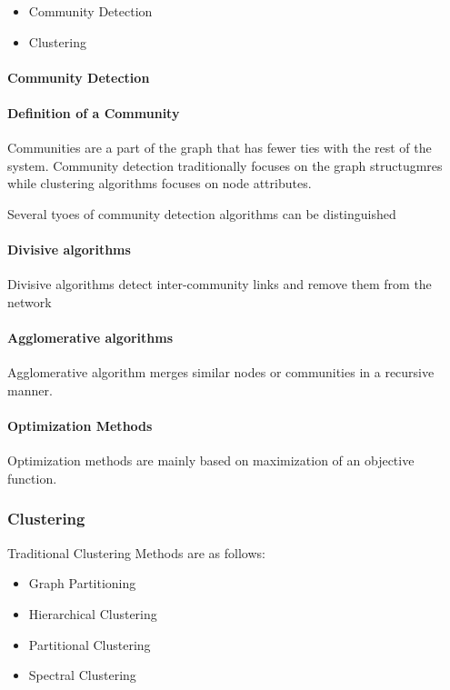 \begin{itemize}
\item Community Detection
\item Clustering
\end{itemize}

\paragraph{Community Detection}
\paragraph{Definition of a Community}
Communities are a part of the graph that has fewer ties with the rest of the system. Community detection traditionally focuses on the graph structugmres while clustering algorithms focuses on node attributes. 

Several tyoes of community detection algorithms can be distinguished
\paragraph{Divisive algorithms}
Divisive algorithms detect inter-community links and remove them from the network

\paragraph{Agglomerative algorithms}
Agglomerative algorithm merges similar nodes or communities in a recursive manner.

\paragraph{Optimization Methods}
Optimization methods are mainly based on maximization of an objective function.




\subsubsection{Clustering}

Traditional Clustering Methods are as follows:
\begin{itemize}

\item Graph Partitioning 

\item Hierarchical Clustering

\item Partitional Clustering

\item Spectral Clustering

\end{itemize}

